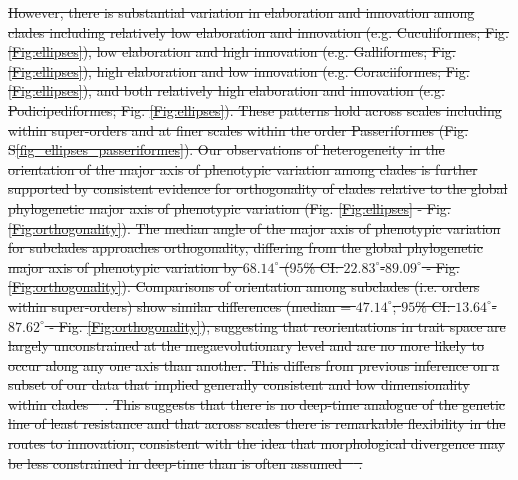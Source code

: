\documentclass[12pt,letterpaper]{article}
\providecommand{\DIFdeltex}[1]{{\protect\color{red}\sout{#1}}}                      %
\providecommand{\DIFdelbegin}{} %
\providecommand{\DIFdelend}{} %
\providecommand{\DIFdel}[1]{\texorpdfstring{\DIFdeltex{#1}}{}} %
\newcommand{\DIFscaledelfig}{0.5}
\newlength{\DIFdelgraphicswidth} %
\newlength{\DIFdelgraphicsheight} %
\newcommand{\DIFdelincludegraphics}[2][]{%
\sbox{\DIFdelgraphicsbox}{\DIFOincludegraphics[#1]{#2}}%
\settoboxwidth{\DIFdelgraphicswidth}{\DIFdelgraphicsbox} %
\settoboxtotalheight{\DIFdelgraphicsheight}{\DIFdelgraphicsbox} %
\scalebox{\DIFscaledelfig}{%
\parbox[b]{\DIFdelgraphicswidth}{\usebox{\DIFdelgraphicsbox}\\[-\baselineskip] \rule{\DIFdelgraphicswidth}{0em}}\llap{\resizebox{\DIFdelgraphicswidth}{\DIFdelgraphicsheight}{%
\setlength{\unitlength}{\DIFdelgraphicswidth}%
\begin{picture}(1,1)%
\thicklines\linethickness{2pt} %
{\color[rgb]{1,0,0}\put(0,0){\framebox(1,1){}}}%
{\color[rgb]{1,0,0}\put(0,0){\line( 1,1){1}}}%
{\color[rgb]{1,0,0}\put(0,1){\line(1,-1){1}}}%
\end{picture}%
}\hspace*{3pt}}} %
} %
\DeclareRobustCommand{\DIFdelbegin}{\DIFOdelbegin \let\includegraphics\DIFdelincludegraphics} %
\DeclareRobustCommand{\DIFdelend}{\DIFOaddend \let\includegraphics\DIFOincludegraphics} %
\begin{document}
\DIFdelbegin \DIFdel{However, there is substantial variation in elaboration and innovation among clades including relatively low elaboration and innovation (e.g. Cuculiformes; Fig. \ref{Fig:ellipses}), low elaboration and high innovation (e.g. Galliformes; Fig. \ref{Fig:ellipses}), high elaboration and low innovation (e.g. Coraciiformes; Fig. \ref{Fig:ellipses}), and both relatively high elaboration and innovation (e.g. Podicipediformes; Fig. \ref{Fig:ellipses}).
These patterns hold across scales including within super-orders and at finer scales within the order Passeriformes (Fig. S\ref{fig_ellipses_passeriformes}).
Our observations of heterogeneity in the orientation of the major axis of phenotypic variation among clades is further supported by consistent evidence for orthogonality of clades relative to the global phylogenetic major axis of phenotypic variation (Fig. \ref{Fig:ellipses} - Fig. \ref{Fig:orthogonality}).
The median angle of the major axis of phenotypic variation for subclades approaches orthogonality, differing from the global phylogenetic major axis of phenotypic variation by $68.14^\circ$ ($95$\% CI: $22.83^\circ$-$89.09^\circ$ - Fig. \ref{Fig:orthogonality}).
Comparisons of orientation among subclades (i.e. orders within super-orders) show similar differences (median = $47.14^\circ$; $95$\% CI: $13.64^\circ$-$87.62^\circ$ - Fig. \ref{Fig:orthogonality}), suggesting that reorientations in trait space are largely unconstrained at the megaevolutionary level and are no more likely to occur along any one axis than another.
This differs from previous inference on a subset of our data that implied generally consistent and low dimensionality within clades \mbox{%
\cite{cooney2017mega}}\hskip0pt%
.
This suggests that there is no deep-time analogue of the genetic line of least resistance and that across scales there is remarkable flexibility in the routes to innovation, consistent with the idea that morphological divergence may be less constrained in deep-time than is often assumed \mbox{%
\cite{venditti2011multiple}}\hskip0pt%
.
}\DIFdelend 
\end{document}
